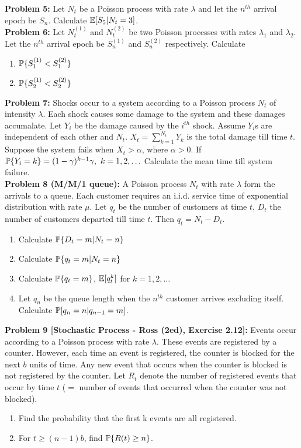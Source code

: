 \documentclass[a4paper,10pt,english]{article}
\begin{document}
\indent \textbf{Problem 5:} Let $N_t$ be a Poisson process with rate $\lambda$ and let the $n^{th}$ arrival epoch be $S_n$. Calculate $\E[S_5|N_t = 3]$. \\
\indent \textbf{Problem 6:} Let $N^{(1)}_t$ and $N^{(2)}_t$ be two  Poisson processes with rates $\lambda_1$ and $\lambda_2$. Let the $n^{th}$ arrival epoch be $S^{(1)}_n$ and $S^{(2)}_n$ respectively. Calculate
\begin{enumerate}
\item $\P\{ S^{(1)}_1 < S^{(2)}_1\}$
\item $\P\{ S^{(1)}_2 < S^{(2)}_2\}$
\end{enumerate} 

\indent \textbf{Problem 7:} Shocks occur to a system according to a Poisson process $N_t$ of intensity $\lambda$. Each shock causes some damage to the system and these damages accumalate. Let $Y_i$ be the damage caused by the $i^{th}$ shock. Assume $Y_i$s are independent of each other and $N_t$. $X_t = \sum_{k=1}^{N_t} Y_k$ is the total damage till time $t$. Suppose the system fails when $X_t > \alpha$, where $\alpha > 0$. If $\P\{Y_i = k\} = (1-\gamma)^{k-1}\gamma, \ k = 1,2,\ldots$ Calculate the mean time till system failure.  \\
\indent \textbf{Problem 8 (M/M/1 queue):} A Poisson process $N_t$ with rate $\lambda$ form the arrivals to a queue. Each customer requires an i.i.d. service time of exponential distribution with rate $\mu$. Let $q_t$ be the number of customers at time $t$, $D_t$ the number of customers departed till time $t$. Then $q_t = N_t - D_t$. 
\begin{enumerate}
\item Calculate $\P\{D_t=m|N_t=n\}$
\item Calculate $\P\{q_t=m|N_t=n\}$
\item Calculate $\P\{q_t=m\}$, $\E[q_t^k]$ for $k=1,2,\ldots$
\item Let $q_n$ be the queue length when the $n^{th}$ customer arrives excluding itself. Calculate $\P[q_n = n|q_{n-1} = m]$.
\end{enumerate}

\indent \textbf{Problem 9 [Stochastic Process - Ross (2ed), Exercise 2.12]:} Events occur according to a Poisson process with rate $\lambda$. These events are registered by a counter. However, each time an event is registered, the counter is blocked for the next $b$ units of time. Any new event that occurs when the counter is blocked is not registered by the counter. Let $R_t$ denote the number of registered events that occur by time $t$ ($=$ number of events that occurred when the counter was not blocked). 
\begin{enumerate}
\item Find the probability that the first k events are all registered.
\item For $t \geq (n-1)b$, find $\P\{R(t) \geq n\}$.
\end{enumerate}
\end{document}
